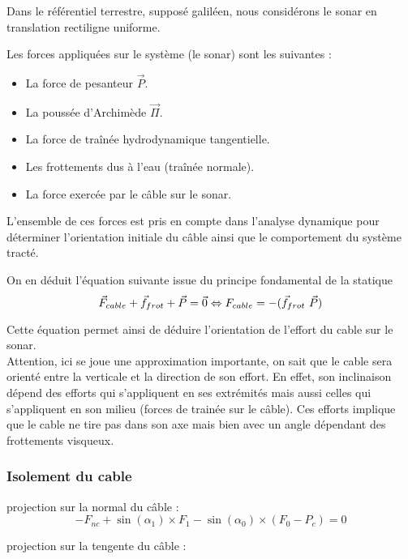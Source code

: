 \documentclass[12pt,a4paper]{report}
\begin{document}
Dans le référentiel terrestre, supposé galiléen, nous considérons le sonar en translation rectiligne uniforme.

Les forces appliquées sur le système (le sonar) sont les suivantes :
\begin{itemize}
  \item La force de pesanteur \( \vec{P} \).
  \item La poussée d’Archimède \( \vec{\Pi} \).
  \item La force de traînée hydrodynamique tangentielle.
  \item Les frottements dus à l’eau (traînée normale).
  \item La force exercée par le câble sur le sonar.
\end{itemize}

L’ensemble de ces forces est pris en compte dans l’analyse dynamique pour déterminer l’orientation initiale du câble
ainsi que le comportement du système tracté.

On en déduit l'équation suivante issue du principe fondamental de la statique
\\
\[
    \vec{F}_{cable} + \vec{f}_{frot} + \vec{P} = \vec{0} \\
    \Leftrightarrow  {F}_{cable} = - (\vec{f}_{frot} \ \vec{P})
\]


Cette équation permet ainsi de déduire l'orientation de l'effort du cable sur le sonar. \\
Attention, ici se joue une approximation importante, on sait que le cable sera orienté entre la verticale et la
direction de son effort. En effet, son inclinaison dépend des efforts qui s'appliquent en ses extrémités mais aussi
celles qui s'appliquent en son milieu (forces de trainée sur le câble). Ces efforts implique que le cable ne tire pas
dans son axe mais bien avec un angle dépendant des frottements visqueux.

\subsubsection*{Isolement du cable}

projection sur la normal du câble :
\[
    -F_{nc} + \sin(\alpha_1) \times F_1 - \sin(\alpha_0) \times (F_0 - P_{c}) = 0
\]

projection sur la tengente du câble :
\end{document}
